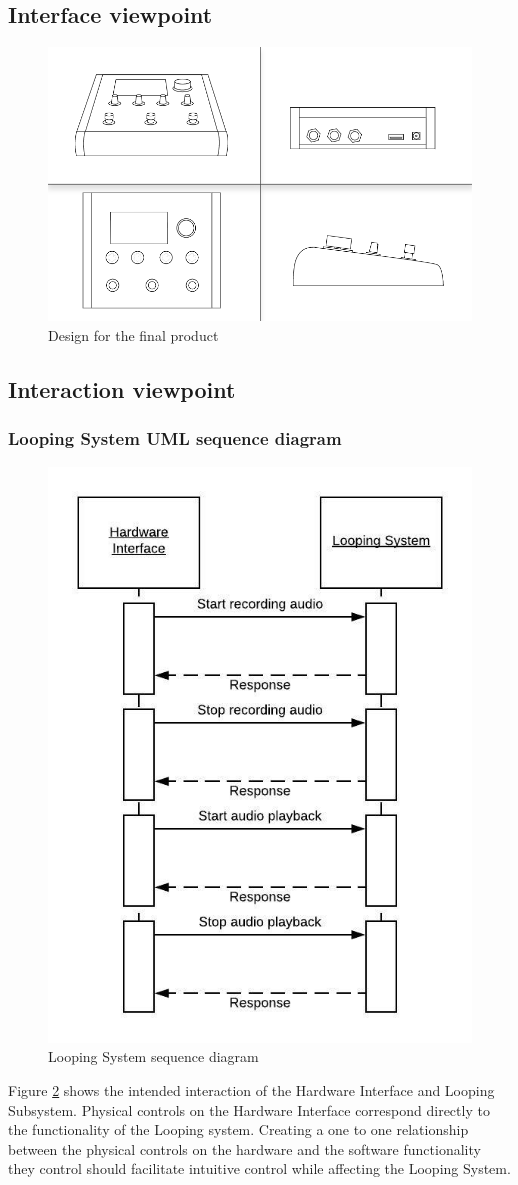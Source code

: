 \subsection{Interface viewpoint}
\begin{figure}[!ht]
    \centering
    \includegraphics[width=.75\textwidth]{diagrams/DAMPedalDesign.png}
    \caption{Design for the final product}
    \label{fig:pedal diagram}
\end{figure}

\subsection{Interaction viewpoint}

    \subsubsection{Looping System UML sequence diagram}
        \begin{figure}[!ht]
            \centering
            \includegraphics[width=.45\textwidth]{diagrams/looping-interaction.jpeg}
            \caption{Looping System sequence diagram}
            \label{fig:looping}
        \end{figure}
       Figure \ref{fig:looping} shows the intended interaction of the Hardware Interface and Looping Subsystem. Physical controls on the Hardware Interface correspond directly to the functionality of the Looping system. Creating a one to one relationship between the physical controls on the hardware and the software functionality they control should facilitate intuitive control while affecting the Looping System.

